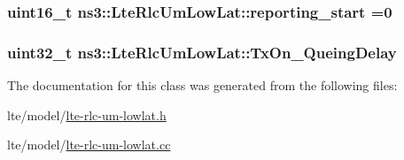 \subsubsection[{\texorpdfstring{reporting\+\_\+start}{reporting_start}}]{\setlength{\rightskip}{0pt plus 5cm}uint16\+\_\+t ns3\+::\+Lte\+Rlc\+Um\+Low\+Lat\+::reporting\+\_\+start =0\hspace{0.3cm}{\ttfamily [private]}}\hypertarget{classns3_1_1LteRlcUmLowLat_ad6a6d38a3e9ffbbd185cc16ca102a621}{}\label{classns3_1_1LteRlcUmLowLat_ad6a6d38a3e9ffbbd185cc16ca102a621}
\subsubsection[{\texorpdfstring{Tx\+On\+\_\+\+Queing\+Delay}{TxOn_QueingDelay}}]{\setlength{\rightskip}{0pt plus 5cm}uint32\+\_\+t ns3\+::\+Lte\+Rlc\+Um\+Low\+Lat\+::\+Tx\+On\+\_\+\+Queing\+Delay\hspace{0.3cm}{\ttfamily [private]}}\hypertarget{classns3_1_1LteRlcUmLowLat_a3f4fe8416c6ad14ff611b0b57f961afa}{}\label{classns3_1_1LteRlcUmLowLat_a3f4fe8416c6ad14ff611b0b57f961afa}


The documentation for this class was generated from the following files\+:\begin{DoxyCompactItemize}
\item 
lte/model/\hyperlink{lte-rlc-um-lowlat_8h}{lte-\/rlc-\/um-\/lowlat.\+h}\item 
lte/model/\hyperlink{lte-rlc-um-lowlat_8cc}{lte-\/rlc-\/um-\/lowlat.\+cc}\end{DoxyCompactItemize}
